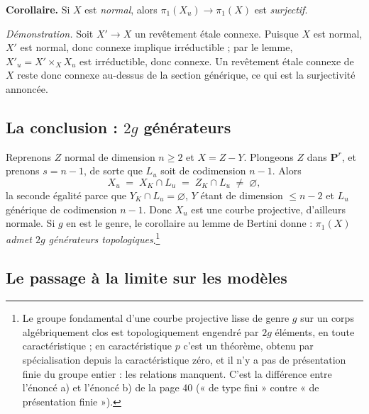 \documentclass[11pt,a4paper]{article}
\begin{document}
\textbf{Corollaire.} Si $X$ est \emph{normal}, alors
$\pi_{1}(X_{u}) \to \pi_{1}(X)$ est \emph{surjectif}.

\emph{Démonstration.} Soit $X' \to X$ un revêtement étale connexe. Puisque $X$
est normal, $X'$ est normal, donc connexe implique irréductible ; par le lemme,
$X'_{u} = X' \times_{X} X_{u}$ est irréductible, donc connexe. Un revêtement
étale connexe de $X$ reste donc connexe au-dessus de la section générique, ce
qui est la surjectivité annoncée.


\subsection*{La conclusion : $2g$ générateurs}

Reprenons $Z$ normal de dimension $n \geqslant 2$ et $X = Z - Y$. Plongeons $Z$
dans $\mathbf{P}^{r}$, et prenons $s = n-1$, de sorte que $L_{u}$ soit de
codimension $n-1$. Alors
\[
  X_{u} \;=\; X_{K} \cap L_{u} \;=\; Z_{K} \cap L_{u} \;\neq\; \varnothing ,
\]
la seconde égalité parce que $Y_{K} \cap L_{u} = \varnothing$, $Y$ étant de
dimension $\leqslant n-2$ et $L_{u}$ générique de codimension $n-1$. Donc
$X_{u}$ est une courbe projective, d'ailleurs normale. Si $g$ en est le genre,
le corollaire au lemme de Bertini donne : \emph{$\pi_{1}(X)$ admet $2g$
générateurs topologiques}.\footnote{Le groupe fondamental d'une courbe
projective lisse de genre $g$ sur un corps algébriquement clos est
topologiquement engendré par $2g$ éléments, en toute caractéristique ;
en caractéristique $p$ c'est un théorème, obtenu par spécialisation depuis la
caractéristique zéro, et il n'y a pas de présentation finie du groupe entier :
les relations manquent. C'est la différence entre l'énoncé a) et
l'énoncé b) de la page 40 (« de type fini » contre « de présentation finie »).}

\subsection*{Le passage à la limite sur les modèles}
\end{document}
